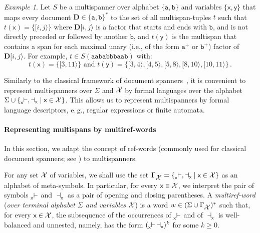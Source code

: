 \documentclass[
a4paper
]{article}
\theoremstyle{plain}
\theoremstyle{definition}
\theoremstyle{remark}
\newtheorem{example}[theorem]{Example}
\newcommand{\varset}{\mbox{\ensuremath{\mathcal{X}}}}
\DeclareMathOperator{\openmark}{\vdash}
\DeclareMathOperator{\closemark}{\dashv}
\newcommand{\doc}{\ensuremath{\mathbf{D}}}
\newcommand{\spann}[2]{\ensuremath{[#1,#2\rangle}}
\newcommand{\open}[1]{\prescript{}{#1}{\openmark}}
\newcommand{\close}[1]{\closemark_{#1}}
\newcommand{\ta}{\ensuremath{\mathtt{a}}}
\newcommand{\tb}{\ensuremath{\mathtt{b}}}
\newcommand{\varsx}{\ensuremath{\textsf{x}}}
\newcommand{\varsy}{\ensuremath{\textsf{y}}}
\begin{document}
\begin{example}\label{multiSpannerExample}
Let $S$ be a multispanner over alphabet $\{\ta, \tb\}$ and variables $\{\varsx, \varsy\}$ that maps every document $\doc \in \{\ta, \tb\}^*$ to the set of all multispan-tuples $t$ such that $t(\varsx) = \{\spann{i}{j}\}$ where $\doc\spann{i}{j}$ is a factor that starts and ends with $\tb$, and is not directly preceded or followed by another $\tb$,
and $t(\varsy)$ is the multispan that contains a span for each maximal unary
(i.e., of the form $\ta^+$ or $\tb^+$)
factor of $\doc\spann{i}{j}$. For example, $t \in S(\ta \ta \tb \ta \tb \tb \tb \ta \ta \tb)$ with:
\begin{equation*}
t(\varsx) = \{\spann{3}{11}\} \text{ and } t(\varsy) = \{\spann{3}{4}, \spann{4}{5}, \spann{5}{8}, \spann{8}{10}, \spann{10}{11}\}\,.
\end{equation*}
\end{example}

Similarly
to the classical framework of document spanners~\cite{fagin2015document}, it is convenient to represent multispanners over $\Sigma$ and $\varset$ by formal languages over the alphabet $\Sigma \cup \{\open{\varsx}, \close{\varsx} \mid \varsx \in \varset\}$. This allows us to represent multispanners by formal language descriptors, e.\,g., regular expressions or finite automata.

\paragraph{Representing multispans by multiref-words} In this section, we adapt the concept of ref-words (commonly used for classical document spanners; 
see \cite{FreydenbergerThompson2020, Freydenberger2019, DoleschalEtAl2019, SchmidSchweikardt_Gems})
to multispanners.

For any set $\varset$ of variables, we shall use the set $\Gamma_{\varset} = \{\open{\varsx}, \close{\varsx} \mid \varsx \in \varset\}$ as an alphabet of meta-symbols. In particular, for every $\varsx \in \varset$, we interpret the pair of symbols $\open{\varsx}$ and $\close{\varsx}$ as a pair of opening and closing parentheses.
A \emph{multiref-word} (\emph{over terminal alphabet $\Sigma$ and variables $\varset$}) is a word $w \in (\Sigma \cup \Gamma_{\varset})^*$ such that, for every $\varsx \in \varset$, the subsequence of the occurrences of $\open{\varsx}$ and of $\close{\varsx}$ is well-balanced and unnested, namely, has the form $(\open{\varsx} \close{\varsx})^k$ for some $k \geq 0$. 
\end{document}
